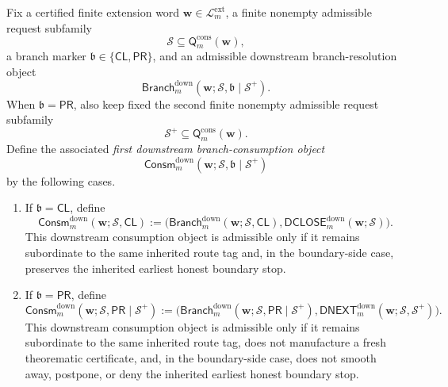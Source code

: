 \begin{definition}
\label{def:first-downstream-branch-consumption-object}
Fix a certified finite extension word \(\mathbf w\in\mathcal L^{\mathrm{ext}}_{m}\), a finite nonempty admissible request subfamily
\[
  \mathcal S \subseteq \mathsf{Q}^{\mathrm{cons}}_{m}(\mathbf w),
\]
a branch marker \(\mathfrak b\in\{\mathsf{CL},\mathsf{PR}\}\), and an admissible downstream branch-resolution object
\[
  \mathsf{Branch}^{\mathrm{down}}_{m}(\mathbf w;\mathcal S,\mathfrak b\mid\mathcal S^{+}).
\]
When \(\mathfrak b=\mathsf{PR}\), also keep fixed the second finite nonempty admissible request subfamily
\[
  \mathcal S^{+}\subseteq \mathsf{Q}^{\mathrm{cons}}_{m}(\mathbf w).
\]
Define the associated \emph{first downstream branch-consumption object}
\[
  \mathsf{Consm}^{\mathrm{down}}_{m}(\mathbf w;\mathcal S,\mathfrak b\mid\mathcal S^{+})
\]
by the following cases.
\begin{enumerate}[label=(\roman*)]
  \item If \(\mathfrak b=\mathsf{CL}\), define
\[
  \mathsf{Consm}^{\mathrm{down}}_{m}(\mathbf w;\mathcal S,\mathsf{CL})
  :=
  \bigl(
    \mathsf{Branch}^{\mathrm{down}}_{m}(\mathbf w;\mathcal S,\mathsf{CL}),
    \mathsf{DCLOSE}^{\mathrm{down}}_{m}(\mathbf w;\mathcal S)
  \bigr).
\]
This downstream consumption object is admissible only if it remains subordinate to the same inherited route tag and, in the boundary-side case, preserves the inherited earliest honest boundary stop.

  \item If \(\mathfrak b=\mathsf{PR}\), define
\[
  \mathsf{Consm}^{\mathrm{down}}_{m}(\mathbf w;\mathcal S,\mathsf{PR}\mid\mathcal S^{+})
  :=
  \bigl(
    \mathsf{Branch}^{\mathrm{down}}_{m}(\mathbf w;\mathcal S,\mathsf{PR}\mid\mathcal S^{+}),
    \mathsf{DNEXT}^{\mathrm{down}}_{m}(\mathbf w;\mathcal S,\mathcal S^{+})
  \bigr).
\]
This downstream consumption object is admissible only if it remains subordinate to the same inherited route tag, does not manufacture a fresh theorematic certificate, and, in the boundary-side case, does not smooth away, postpone, or deny the inherited earliest honest boundary stop.
\end{enumerate}
\end{definition}

